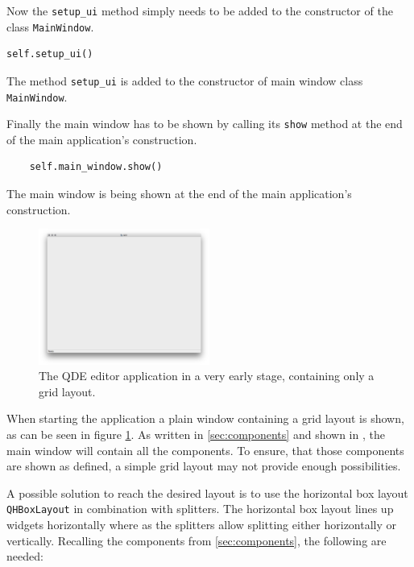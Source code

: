 \documentclass[10pt, openright, notitlepage]{scrreprt}
\begin{document}
Now the \texttt{setup\_ui} method simply needs to be added to the constructor of the
class \texttt{MainWindow}.

\begin{listing}[H]
\begin{verbatim}
self.setup_ui()
\end{verbatim}
\caption{\label{main-window-constructor}
The method \texttt{setup\_ui} is added to the constructor of main window class \texttt{MainWindow}.}
\end{listing}

Finally the main window has to be shown by calling its \texttt{show} method
at the end of the main application's construction.

\begin{listing}[H]
\begin{verbatim}
    self.main_window.show()
\end{verbatim}
\caption{\label{app-application-constructor}
The main window is being shown at the end of the main application's construction.}
\end{listing}

\begin{figure}[H]
\centering
\includegraphics[width=0.5\textwidth]{./images/qde_alpha_01.png}
\caption{\label{fig:editor-alpha-01}
The QDE editor application in a very early stage, containing only a grid layout.}
\end{figure}

When starting the application a plain window containing a grid layout is shown,
as can be seen in figure \ref{fig:editor-alpha-01}. As written in \ref{sec:components} and
shown in \citep[p. 29 ff.]{osterwalder_qde_2016}, the main window will contain all
the components. To ensure, that those components are shown as defined, a simple
grid layout may not provide enough possibilities.

A possible solution to reach the desired layout is to use the horizontal box
layout \texttt{QHBoxLayout} in combination with splitters. The horizontal box layout
lines up widgets horizontally where as the splitters allow splitting either
horizontally or vertically. Recalling the components from \ref{sec:components}, the following are needed:
\end{document}
